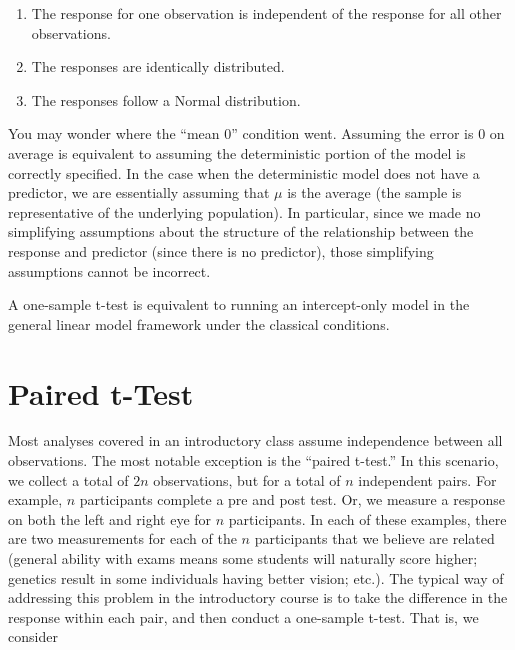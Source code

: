 \documentclass[
  letterpaper,
  DIV=11,
  numbers=noendperiod]{scrreprt}
\providecommand{\tightlist}{%
  \setlength{\itemsep}{0pt}\setlength{\parskip}{0pt}}\usepackage{longtable,booktabs,array}
\theoremstyle{definition}
\theoremstyle{definition}
\theoremstyle{remark}
\begin{document}
\begin{enumerate}
\def\labelenumi{\arabic{enumi}.}
\tightlist
\item
  The response for one observation is independent of the response for
  all other observations.
\item
  The responses are identically distributed.
\item
  The responses follow a Normal distribution.
\end{enumerate}

You may wonder where the ``mean 0'' condition went. Assuming the error
is 0 on average is equivalent to assuming the deterministic portion of
the model is correctly specified. In the case when the deterministic
model does not have a predictor, we are essentially assuming that
\(\mu\) is the average (the sample is representative of the underlying
population). In particular, since we made no simplifying assumptions
about the structure of the relationship between the response and
predictor (since there is no predictor), those simplifying assumptions
cannot be incorrect.

\begin{tcolorbox}[enhanced jigsaw, bottomrule=.15mm, titlerule=0mm, bottomtitle=1mm, colback=white, coltitle=black, rightrule=.15mm, leftrule=.75mm, toprule=.15mm, toptitle=1mm, left=2mm, opacityback=0, colframe=quarto-callout-tip-color-frame, breakable, title=\textcolor{quarto-callout-tip-color}{\faLightbulb}\hspace{0.5em}{Big Idea}, arc=.35mm, colbacktitle=quarto-callout-tip-color!10!white, opacitybacktitle=0.6]

A one-sample t-test is equivalent to running an intercept-only model in
the general linear model framework under the classical conditions.

\end{tcolorbox}

\hypertarget{paired-t-test}{%
\section{Paired t-Test}\label{paired-t-test}}

Most analyses covered in an introductory class assume independence
between all observations. The most notable exception is the ``paired
t-test.'' In this scenario, we collect a total of \(2n\) observations,
but for a total of \(n\) independent pairs. For example, \(n\)
participants complete a pre and post test. Or, we measure a response on
both the left and right eye for \(n\) participants. In each of these
examples, there are two measurements for each of the \(n\) participants
that we believe are related (general ability with exams means some
students will naturally score higher; genetics result in some
individuals having better vision; etc.). The typical way of addressing
this problem in the introductory course is to take the difference in the
response within each pair, and then conduct a one-sample t-test. That
is, we consider
\end{document}

